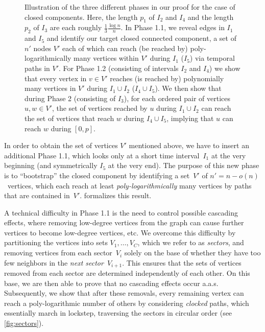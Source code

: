\documentclass[a4paper,11pt]{article}
\theoremstyle{definition}
\theoremstyle{plain}
\begin{document}
\begin{figure}[bt]
\begin{center}
{
  }
  \end{center}
  \caption{Illustration of the three different phases in our proof for the case of closed components. Here, the length $p_1$ of $I_2$ and $I_4$ and the length $p_2$ of $I_3$ are each roughly $\frac{1}{3}\frac{\log n}{n}$.
  In Phase 1.1, we reveal edges in $I_1$ and $I_5$ and identify our target closed connected component, a set of $n'$ nodes $V'$ each of which can reach (be reached by) poly-logarithmically many vertices within $V'$ during $I_1$ ($I_5$) via temporal paths in $V'$. 
  For Phase 1.2 (consisting of intervals $I_2$ and $I_4$) we show that every vertex in $v \in V'$ reaches (is reached by) polynomially many vertices in $V'$ during $I_1 \cup I_2$ ($I_4 \cup I_5$). 
  We then show that during Phase 2 (consisting of $I_3$), for each ordered pair of vertices $u,w \in V'$, the set of vertices reached by $u$ during $I_1 \cup I_2$ can reach the set of vertices that reach $w$ during $I_4 \cup I_5$, implying that $u$ can reach $w$ during $[0,p]$.}
  \label{fig:closed_component_three_phases}
\end{figure}

  In order to obtain the set of vertices $V'$ mentioned above, we have to insert an additional Phase 1.1,
  which looks only at a short time interval~$I_1$ at the very beginning (and symmetrically $I_5$ at the very end).
  The purpose of this new phase is to ``bootstrap'' the closed component by identifying a set~$V'$ of $n' = n - o(n)$~vertices,
  which each reach at least \emph{poly-logarithmically} many vertices by paths that are contained in~$V'$.
   formalizes this result.
  
  A technical difficulty in Phase 1.1 is the need to control possible cascading effects,
  where removing low-degree vertices from the graph can cause further vertices to become low-degree vertices, etc.
  We overcome this difficulty by partitioning the vertices into sets $V_1, \dots, V_C$, which we refer to as \emph{sectors}, and removing vertices from each sector~$V_i$ solely on the base of whether they have too few neighbors in the \emph{next sector}~$V_{i+1}$.
  This ensures that the sets of vertices removed from each sector are determined independently of each other.
  On this base, we are then able to prove that no cascading effects occur a.a.s.
  Subsequently, we show that after these removals, every remaining vertex can reach a poly-logarithmic number of others by considering \emph{clocked} paths, which essentially march in lockstep, traversing the sectors in circular order (see \cref{fig:sectors}).
  
\end{document}
